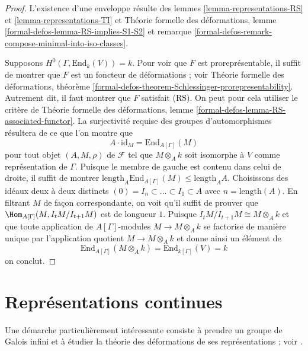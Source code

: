\begin{proof}
L'existence d'une enveloppe résulte des lemmes \ref{lemma-representations-RS} et
\ref{lemma-representations-TI} et
Théorie formelle des déformations, lemme \ref{formal-defos-lemma-RS-implies-S1-S2}
et remarque \ref{formal-defos-remark-compose-minimal-into-iso-classes}.

\medskip\noindent
Supposons $H^0(\Gamma, \text{End}_k(V)) = k$. Pour voir que $F$
est proreprésentable, il suffit de montrer que $F$ est un
foncteur de déformations ; voir Théorie formelle des déformations, théorème
\ref{formal-defos-theorem-Schlessinger-prorepresentability}.
Autrement dit, il faut montrer que $F$ satisfait (RS).
On peut pour cela utiliser le critère de Théorie formelle des déformations, lemme
\ref{formal-defos-lemma-RS-associated-functor}.
La surjectivité requise des groupes d'automorphismes résultera de ce que
l'on montre que
$$
A \cdot \text{id}_M =
\text{End}_{A[\Gamma]}(M)
$$
pour tout objet $(A, M, \rho)$ de $\mathcal{F}$ tel que
$M \otimes_A k$ soit isomorphe à $V$ comme représentation de $\Gamma$.
Puisque le membre de gauche est contenu dans celui de droite,
il suffit de montrer
$\text{length}_A \text{End}_{A[\Gamma]}(M) \leq \text{length}_A A$.
Choisissons des idéaux deux à deux distincts
$(0) = I_n \subset \ldots \subset I_1 \subset A$
avec $n = \text{length}(A)$. En filtrant $M$
de façon correspondante, on voit qu'il suffit de prouver que $\Hom_{A[\Gamma]}(M, I_tM/I_{t + 1}M)$
est de longueur $1$. Puisque $I_tM/I_{t + 1}M \cong M \otimes_A k$
et que toute application de $A[\Gamma]$-modules $M \to M \otimes_A k$ se factorise
de manière unique par l'application quotient $M \to M \otimes_A k$
et donne ainsi un élément de
$$
\text{End}_{A[\Gamma]}(M \otimes_A k) = \text{End}_{k[\Gamma]}(V) = k
$$
on conclut.
\end{proof}



\section{Représentations continues}
\label{section-continuous-representations}

\noindent
Une démarche particulièrement intéressante consiste à prendre un groupe de Galois
infini et à étudier la théorie des déformations de ses représentations ; voir
\cite{Mazur-deforming}.

